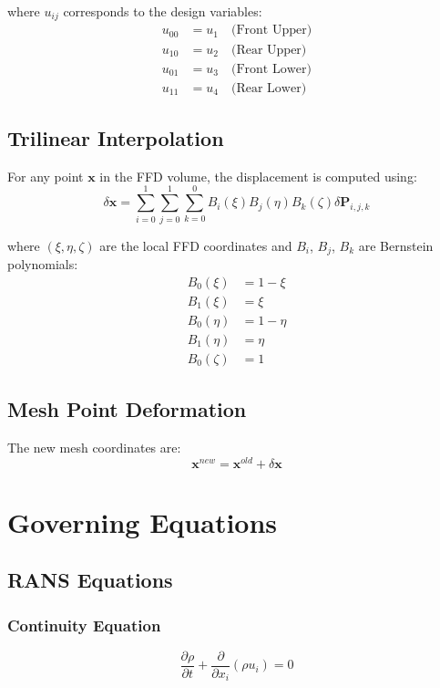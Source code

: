 \documentclass{article}
\begin{document}
where $u_{ij}$ corresponds to the design variables:
\begin{align}
u_{00} &= u_1 \quad \text{(Front Upper)} \\
u_{10} &= u_2 \quad \text{(Rear Upper)} \\
u_{01} &= u_3 \quad \text{(Front Lower)} \\
u_{11} &= u_4 \quad \text{(Rear Lower)}
\end{align}

\subsection{Trilinear Interpolation}
For any point $\mathbf{x}$ in the FFD volume, the displacement is computed using:
\begin{equation}
\delta \mathbf{x} = \sum_{i=0}^{1} \sum_{j=0}^{1} \sum_{k=0}^{0} B_i(\xi) B_j(\eta) B_k(\zeta) \delta \mathbf{P}_{i,j,k}
\end{equation}

where $(\xi, \eta, \zeta)$ are the local FFD coordinates and $B_i$, $B_j$, $B_k$ are Bernstein polynomials:
\begin{align}
B_0(\xi) &= 1 - \xi \\
B_1(\xi) &= \xi \\
B_0(\eta) &= 1 - \eta \\
B_1(\eta) &= \eta \\
B_0(\zeta) &= 1
\end{align}

\subsection{Mesh Point Deformation}
The new mesh coordinates are:
\begin{equation}
\mathbf{x}^{new} = \mathbf{x}^{old} + \delta \mathbf{x}
\end{equation}

\section{Governing Equations}

\subsection{RANS Equations}
\subsubsection{Continuity Equation}
\begin{equation}
\frac{\partial \rho}{\partial t} + \frac{\partial}{\partial x_i}(\rho u_i) = 0
\end{equation}
\end{document}
